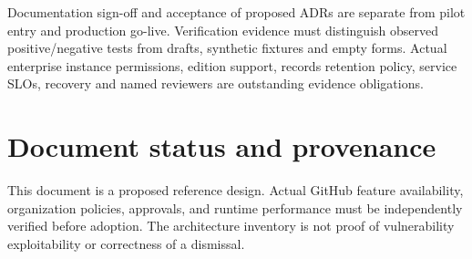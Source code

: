 \documentclass[11pt,letterpaper]{article}
\begin{document}
Documentation sign-off and acceptance of proposed ADRs are separate from pilot entry and production go-live. Verification evidence must distinguish observed positive/negative tests from drafts, synthetic fixtures and empty forms. Actual enterprise instance permissions, edition support, records retention policy, service SLOs, recovery and named reviewers are outstanding evidence obligations.

\section*{Document status and provenance}
This document is a proposed reference design. Actual GitHub feature availability, organization policies, approvals, and runtime performance must be independently verified before adoption. The architecture inventory is not proof of vulnerability exploitability or correctness of a dismissal.
\end{document}
